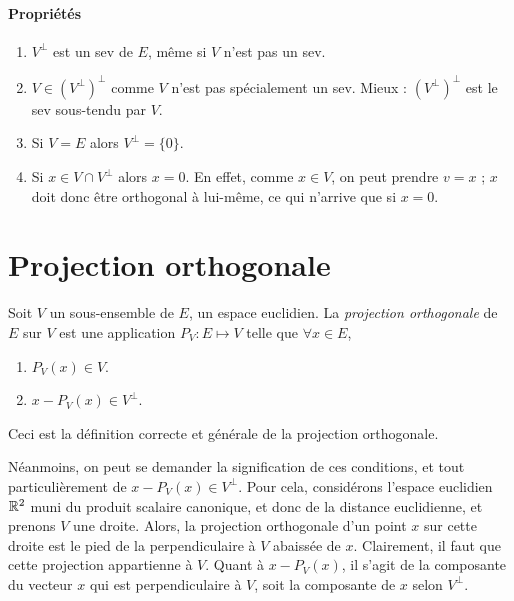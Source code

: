 \paragraph{Propriétés}

\begin{enumerate}
\item $V^\perp$ est un sev de $E$, même si $V$ n'est pas un sev.
\item $V \in \left( V^\perp \right)^\perp$ comme $V$ n'est pas spécialement un sev. Mieux : $\left( V^\perp \right)^\perp$ est le sev sous-tendu par $V$.
\item Si $V=E$ alors $V^\perp = \{ 0 \}$.
\item Si $x \in V \cap V^\perp$ alors $x=0$. En effet, comme $x \in V$, on peut prendre $v=x$ ; $x$ doit donc être orthogonal à lui-même, ce qui n'arrive que si $x=0$.
\end{enumerate}


\section{Projection orthogonale}

\begin{defn}
Soit $V$ un sous-ensemble de $E$, un espace euclidien. La \emph{projection orthogonale} de $E$ sur $V$ est une application $P_V \colon E \mapsto V$ telle que $\forall x \in E$,
\begin{enumerate}
\item $P_V(x) \in V$.
\item $x - P_V(x) \in V^\perp$.
\end{enumerate}
Ceci est la définition correcte et générale de la projection orthogonale.
\end{defn}

Néanmoins, on peut se demander la signification de ces conditions, et tout particulièrement de $x - P_V(x) \in V^\perp$. Pour cela, considérons l'espace euclidien $\mathbb{R}^2$ muni du produit scalaire canonique, et donc de la distance euclidienne, et prenons $V$ une droite. Alors, la projection orthogonale d'un point $x$ sur cette droite est le pied de la perpendiculaire à $V$ abaissée de $x$. Clairement, il faut que cette projection appartienne à $V$. Quant à $x-P_V(x)$, il s'agit de la composante du vecteur $x$ qui est perpendiculaire à $V$, soit la composante de $x$ selon $V^\perp$.

